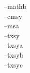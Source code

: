 \selectfont--\textrm{mathb}\@all@characters\\
\selectfont--\textrm{cmsy}\@all@characters\\
\selectfont--\textrm{msa}\@all@characters\\
\selectfont--\textrm{txsy}\@all@characters\\
\selectfont--\textrm{txsya}\@all@characters\\
\selectfont--\textrm{txsyb}\@all@characters\\
\selectfont--\textrm{txsyc}\@all@characters\\
